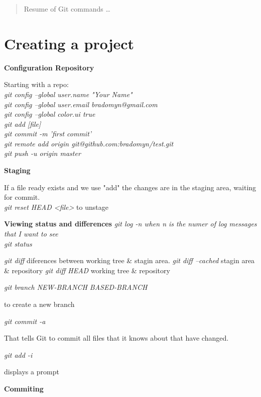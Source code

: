 \documentclass[12pt]{article}
\newcommand \tb[1]{\textbf{#1}}
\newcommand \ti[1]{\textit{#1}}
\begin{document}
\maketitle

\begin{abstract}
Resume of Git commands \ldots
\end{abstract}

\section*{Creating a project}

\tb{Configuration Repository}

Starting with a repo: \\
\ti{
 git config --global user.name "Your Name" \\
 git config --global user.email bradomyn@gmail.com \\
 git config --global color.ui true \\
 git add [file] \\
 git commit -m 'first commit' \\ 
 git remote add origin git@github.com:bradomyn/test.git \\
 git push -u origin master \\
}

\tb{Staging}

 If a file ready exists and we use "add" the changes are in the 
 staging area, waiting for commit. \\

 \ti{git reset HEAD <file>} to unstage

\tb{Viewing status and differences}
\noindent
\ti{ git log -n when n is the numer of log messages that I want to see \\
 git status \\
}

\ti{git diff} diferences between working tree \& stagin area.
\ti{git diff --cached} stagin area \& repository
\ti{git diff HEAD} working tree & repository


\ti{git branch NEW-BRANCH  BASED-BRANCH}

to create a new branch 

 \ti{git commit -a}

 That tells Git to commit all files that it knows about that have 
 changed.

 \ti{git add -i}

displays a prompt

\tb{Commiting}
\end{document}
